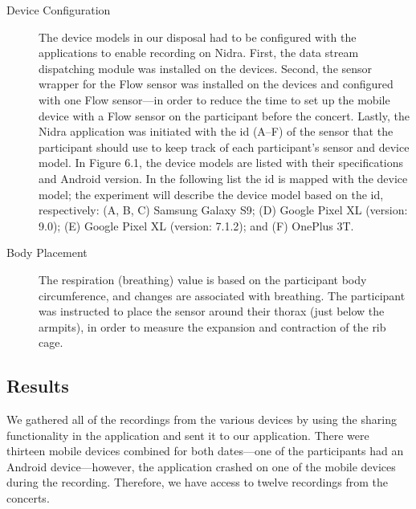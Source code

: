 \begin{description}
    \item[Device Configuration] The device models in our disposal had to be configured with the applications to enable recording on Nidra. First, the data stream dispatching module was installed on the devices. Second, the sensor wrapper for the Flow sensor was installed on the devices and configured with one Flow sensor---in order to reduce the time to set up the mobile device with a Flow sensor on the participant before the concert. Lastly, the Nidra application was initiated with the id (A--F) of the sensor that the participant should use to keep track of each participant's sensor and device model. In Figure 6.1, the device models are listed with their specifications and Android version. In the following list the id is mapped with the device model; the experiment will describe the device model based on the id, respectively: (A, B, C) Samsung Galaxy S9; (D) Google Pixel XL (version: 9.0); (E) Google Pixel XL (version: 7.1.2); and (F) OnePlus 3T. 
    \item[Body Placement] The respiration (breathing) value is based on the participant body circumference, and changes are associated with breathing. The participant was instructed to place the sensor around their thorax (just below the armpits), in order to measure the expansion and contraction of the rib cage.

\end{description}

\subsection{Results}

We gathered all of the recordings from the various devices by using the sharing functionality in the application and sent it to our application. There were thirteen mobile devices combined for both dates---one of the participants had an Android device---however, the application crashed on one of the mobile devices during the recording. Therefore, we have access to twelve recordings from the concerts. 


